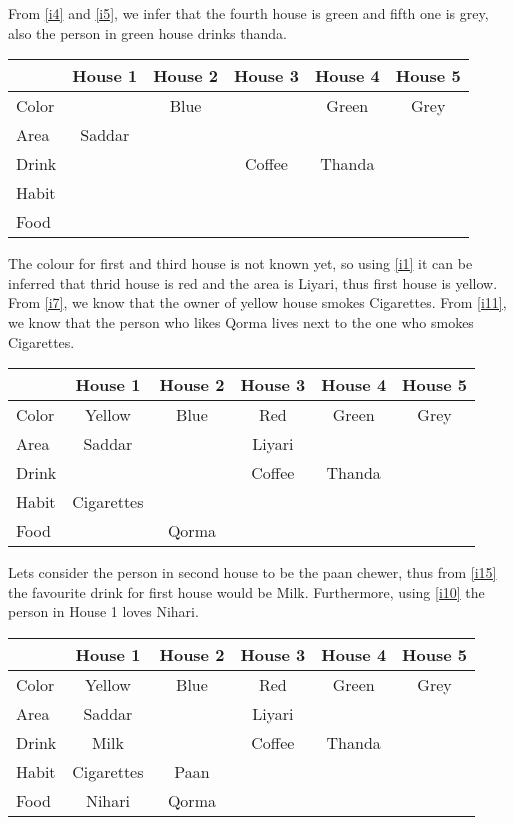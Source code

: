 \documentclass[a4paper]{exam}
\newcommand\cb{\color{blue}}
\begin{document}
\begin{questions}
\begin{solution}
    From \ref{i4} and \ref{i5}, we infer that the fourth house is green and fifth one is grey,\\ also the person in green house drinks thanda.\\
    \begin{tabular}{l||*5{c|}}
      & \textbf{House 1} & \textbf{\cb House 2} & \textbf{House 3} & \textbf{House 4} & \textbf{House 5} \\
      \hline\hline
      Color &  & Blue & & Green & Grey \\\hline
      Area & Saddar & & & & \\\hline
      Drink & & & Coffee & Thanda & \\\hline
      Habit & & & & & \\\hline
      Food & & & & & \\\hline
    \end{tabular}

    The colour for first and third house is not known yet, so using \ref{i1} it can be inferred that thrid house is red and the area is Liyari, thus first house is yellow. From \ref{i7}, we know that the owner of yellow house smokes Cigarettes. From \ref{i11}, we know that the person who likes Qorma lives next to the one who smokes Cigarettes.\\ 
    \begin{tabular}{l||*5{c|}}
      & \textbf{House 1} & \textbf{\cb House 2} & \textbf{House 3} & \textbf{House 4} & \textbf{House 5} \\
      \hline\hline
      Color & Yellow & Blue & Red & Green & Grey \\\hline
      Area & Saddar & & Liyari & & \\\hline
      Drink & & & Coffee & Thanda & \\\hline
      Habit & Cigarettes & & & & \\\hline
      Food & & Qorma & & & \\\hline
    \end{tabular}
    
    Lets consider the person in second house to be the paan chewer, thus from \ref{i15} the favourite drink for first house would be Milk. Furthermore, using \ref{i10} the person in House 1 loves Nihari.\\
    \begin{tabular}{l||*5{c|}}
      & \textbf{House 1} & \textbf{\cb House 2} & \textbf{House 3} & \textbf{House 4} & \textbf{House 5} \\
      \hline\hline
      Color & Yellow & Blue & Red & Green & Grey \\\hline
      Area & Saddar & & Liyari & & \\\hline
      Drink & Milk & & Coffee & Thanda & \\\hline
      Habit & Cigarettes & Paan & & & \\\hline
      Food & Nihari & Qorma & & & \\\hline
    \end{tabular}


\end{solution}
\end{questions}
\end{document}
